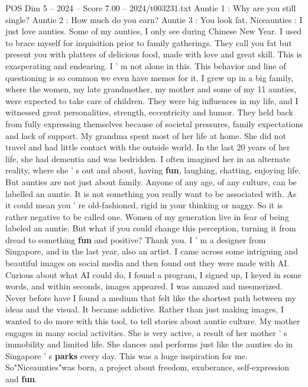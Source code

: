 \begin{textsample}{POS Dim 5 – 2024 – Score 7.00 – 2024/t003231.txt}  \label{ex:f5_pos_067}
Auntie 1 : Why are you still single?
Auntie 2 : How much do you earn?
Auntie 3 : You look fat.
Niceaunties : I just love aunties.
Some of my aunties, I only see during Chinese New Year.
I used to brace myself for inquisition prior to family gatherings.
They call you fat but present you with platters of delicious food, made with love and great skill.
This is exasperating and endearing.
I ' m not alone in this.
This behavior and line of questioning is so common we even have memes for it.
I grew up in a big family, where the women, my late grandmother, my mother and some of my 11 aunties, were expected to take care of children.
They were big influences in my life, and I witnessed great personalities, strength, eccentricity and humor.
They held back from fully expressing themselves because of societal pressures, family expectations and lack of support.
My grandma spent most of her life at home.
She did not travel and had little contact with the outside world.
In the last 20 years of her life, she had dementia and was bedridden.
I often imagined her in an alternate reality, where she ' s out and about, having \textbf{fun}, laughing, chatting, enjoying life.
But aunties are not just about family.
Anyone of any age, of any culture, can be labelled an auntie.
It is not something you really want to be associated with.
As it could mean you ' re old-fashioned, rigid in your thinking or naggy.
So it is rather negative to be called one.
Women of my generation live in fear of being labeled an auntie.
But what if you could change this perception, turning it from dread to something \textbf{fun} and positive?
Thank you.
I ' m a designer from Singapore, and in the last year, also an artist.
I came across some intriguing and beautiful images on social media and then found out they were made with AI.
Curious about what AI could do, I found a program, I signed up, I keyed in some words, and within seconds, images appeared.
I was amazed and mesmerized.
Never before have I found a medium that felt like the shortest path between my ideas and the visual.
It became addictive.
Rather than just making images, I wanted to do more with this tool, to tell stories about auntie culture.
My mother engages in many social activities.
She is very active, a result of her mother ' s immobility and limited life.
She dances and performs just like the aunties do in Singapore ' s \textbf{parks} every day.
This was a huge inspiration for me.
So"Niceaunties"was born, a project about freedom, exuberance, self-expression and \textbf{fun}.

\end{textsample}

